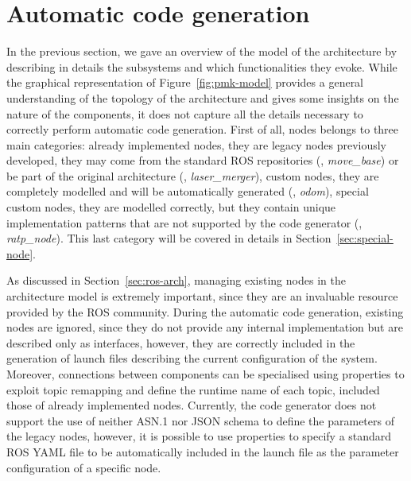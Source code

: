 \section{Automatic code generation}
In the previous section, we gave an overview of the model of the architecture by describing in details the subsystems and which functionalities they evoke. While the graphical representation of Figure~\ref{fig:pmk-model} provides a general understanding of the topology of the architecture and gives some insights on the nature of the components, it does not capture all the details necessary to correctly perform automatic code generation. First of all, nodes belongs to three main categories: already implemented nodes, they are legacy nodes previously developed, they may come from the standard ROS repositories (\eg, \textit{move\_base}) or be part of the original architecture (\eg, \textit{laser\_merger}), custom nodes, they are completely modelled and will be automatically generated (\eg, \textit{odom}), special custom nodes, they are modelled correctly, but they contain unique implementation patterns that are not supported by the code generator (\eg, \textit{ratp\_node}). This last category will be covered in details in Section~\ref{sec:special-node}. 

As discussed in Section~\ref{sec:ros-arch}, managing existing nodes in the architecture model is extremely important, since they are an invaluable resource provided by the ROS community. During the automatic code generation, existing nodes are ignored, since they do not provide any internal implementation but are described only as interfaces, however, they are correctly included in the generation of launch files describing the current configuration of the system. Moreover, connections between components can be specialised using properties to exploit topic remapping and define the runtime name of each topic, included those of already implemented nodes. Currently, the code generator does not support the use of neither ASN.1 nor JSON schema to define the parameters of the legacy nodes, however,  it is possible to use properties to specify a standard ROS YAML file to be automatically included in the launch file as the parameter configuration of a specific node.

